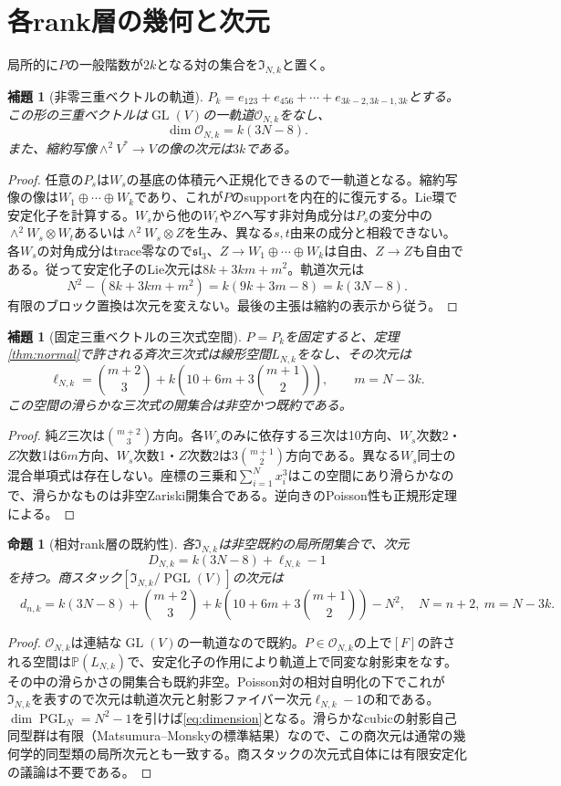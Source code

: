 \documentclass[11pt,a4paper]{ltjsarticle}
\newtheorem{lemma}[theorem]{補題}
\newtheorem{proposition}[theorem]{命題}
\newcommand{\PP}{\mathbb P}
\newcommand{\GL}{\operatorname{GL}}
\newcommand{\PGL}{\operatorname{PGL}}
\begin{document}
\section{各rank層の幾何と次元}
局所的に$P$の一般階数が$2k$となる対の集合を$\mathfrak I_{N,k}$と置く。
\begin{lemma}[非零三重ベクトルの軌道]\label{lem:orbit}
$P_k=e_{123}+e_{456}+\cdots+e_{3k-2,3k-1,3k}$とする。この形の三重ベクトルは$\GL(V)$の一軌道$\mathcal O_{N,k}$をなし、
\[
 \dim\mathcal O_{N,k}=k(3N-8).
\]
また、縮約写像$\wedge^2V^*\to V$の像の次元は$3k$である。
\end{lemma}
\begin{proof}
任意の$P_s$は$W_s$の基底の体積元へ正規化できるので一軌道となる。縮約写像の像は$W_1\oplus\cdots\oplus W_k$であり、これが$P$のsupportを内在的に復元する。Lie環で安定化子を計算する。$W_s$から他の$W_t$や$Z$へ写す非対角成分は$P_s$の変分中の$\wedge^2W_s\otimes W_t$あるいは$\wedge^2W_s\otimes Z$を生み、異なる$s,t$由来の成分と相殺できない。各$W_s$の対角成分はtrace零なので$\mathfrak{sl}_3$、$Z\to W_1\oplus\cdots\oplus W_k$は自由、$Z\to Z$も自由である。従って安定化子のLie次元は$8k+3km+m^2$。軌道次元は
\[
 N^2-(8k+3km+m^2)=k(9k+3m-8)=k(3N-8).
\]
有限のブロック置換は次元を変えない。最後の主張は縮約の表示から従う。
\end{proof}
\begin{lemma}[固定三重ベクトルの三次式空間]\label{lem:fiber}
$P=P_k$を固定すると、定理\ref{thm:normal}で許される斉次三次式は線形空間$L_{N,k}$をなし、その次元は
\[
 \ell_{N,k}=\binom{m+2}{3}
 +k\left(10+6m+3\binom{m+1}{2}\right),\qquad m=N-3k.
\]
この空間の滑らかな三次式の開集合は非空かつ既約である。
\end{lemma}
\begin{proof}
純$Z$三次は$\binom{m+2}3$方向。各$W_s$のみに依存する三次は10方向、$W_s$次数2・$Z$次数1は$6m$方向、$W_s$次数1・$Z$次数2は$3\binom{m+1}2$方向である。異なる$W_s$同士の混合単項式は存在しない。座標の三乗和$\sum_{i=1}^N x_i^3$はこの空間にあり滑らかなので、滑らかなものは非空Zariski開集合である。逆向きのPoisson性も正規形定理による。
\end{proof}
\begin{proposition}[相対rank層の既約性]\label{prop:strata}
各$\mathfrak I_{N,k}$は非空既約の局所閉集合で、次元
\[
 D_{N,k}=k(3N-8)+\ell_{N,k}-1
\]
を持つ。商スタック$[\mathfrak I_{N,k}/\PGL(V)]$の次元は
\begin{equation}\label{eq:dimension}
 \boxed{\quad d_{n,k}
 =k(3N-8)+\binom{m+2}{3}
 +k\left(10+6m+3\binom{m+1}{2}\right)-N^2,\quad
 N=n+2,\ m=N-3k.\quad}
\end{equation}
\end{proposition}
\begin{proof}
$\mathcal O_{N,k}$は連結な$\GL(V)$の一軌道なので既約。$P\in\mathcal O_{N,k}$の上で$[F]$の許される空間は$\PP(L_{N,k})$で、安定化子の作用により軌道上で同変な射影束をなす。その中の滑らかさの開集合も既約非空。Poisson対の相対自明化の下でこれが$\mathfrak I_{N,k}$を表すので次元は軌道次元と射影ファイバー次元$\ell_{N,k}-1$の和である。$\dim\PGL_N=N^2-1$を引けば\eqref{eq:dimension}となる。滑らかなcubicの射影自己同型群は有限（Matsumura--Monskyの標準結果）なので、この商次元は通常の幾何学的同型類の局所次元とも一致する。商スタックの次元式自体には有限安定化の議論は不要である。
\end{proof}
\end{document}
